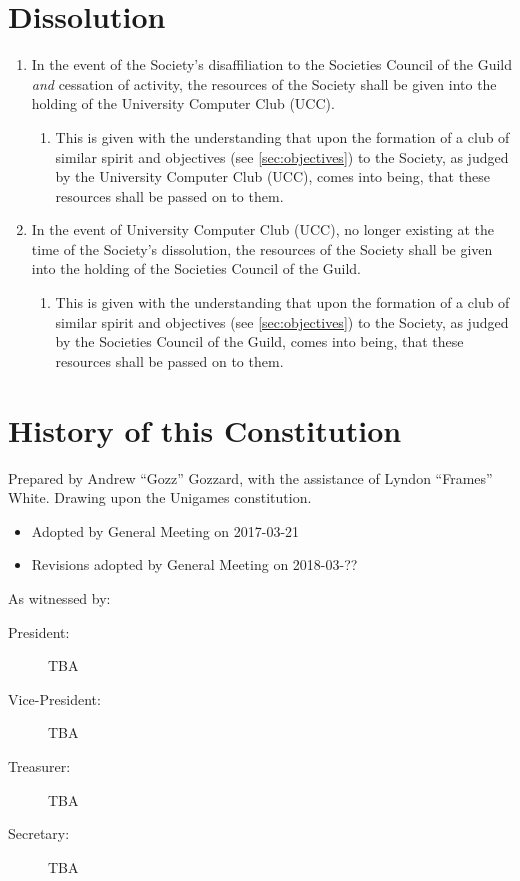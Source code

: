 \documentclass[a4paper]{article}
\begin{document}
\section{Dissolution} \label{sec:dissolution}
\begin{enumerate}
    \item In the event of the Society's disaffiliation to the Societies Council of the Guild \emph{and} cessation of activity, the resources of the Society shall be given into the holding of the University Computer Club (UCC).
    \begin{enumerate}
        \item This is given with the understanding that upon the formation of a club of similar spirit and objectives (see \cref{sec:objectives}) to the Society, as judged by the University Computer Club (UCC), comes into being, that these resources shall be passed on to them.
    \end{enumerate}
    \item In the event of University Computer Club (UCC), no longer existing at the time of the Society's dissolution, the resources of the Society shall be given into the holding of the Societies Council of the Guild.
    \begin{enumerate}
        \item This is given with the understanding that upon the formation of a club of similar spirit and objectives (see \cref{sec:objectives}) to the Society, as judged by the Societies Council of the Guild, comes into being, that these resources shall be passed on to them.
    \end{enumerate}
\end{enumerate}

\appendixpage

\appendix \section{History of this Constitution} \label{app:history}

\noindent Prepared by Andrew ``Gozz'' Gozzard, with the assistance of Lyndon ``Frames'' White. Drawing upon the Unigames constitution.

\medskip{}

\begin{itemize}
	\item[] Adopted by General Meeting on 2017-03-21
    \item[] Revisions adopted by General Meeting on 2018-03-??
\end{itemize}

\medskip{}

\noindent As witnessed by:
\begin{description}
\item [{President:}] TBA \hrulefill
\item [{Vice-President:}] TBA \hrulefill
\item [{Treasurer:}] TBA \hrulefill
\item [{Secretary:}] TBA \hrulefill
\end{description}
\end{document}

